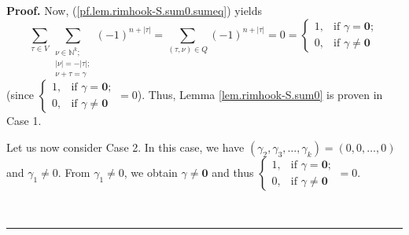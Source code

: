 \documentclass[numbers=enddot,12pt,final,onecolumn,notitlepage]{scrartcl}%
\theoremstyle{definition}
\newenvironment{proof}[1][Proof]{\noindent\textbf{#1.} }{\ \rule{0.5em}{0.5em}}
\let\sumnonlimits\sum
\renewcommand{\sum}{\sumnonlimits\limits}
\begin{document}
\begin{proof}
Now, (\ref{pf.lem.rimhook-S.sum0.sumeq}) yields%
\[
\sum_{\tau\in V}\sum_{\substack{\nu\in\mathbb{N}^{k};\\\left\vert
\nu\right\vert =-\left\vert \tau\right\vert ;\\\nu+\tau=\gamma}}\left(
-1\right)  ^{n+\left\vert \tau\right\vert }=\sum_{\left(  \tau,\nu\right)  \in
Q}\left(  -1\right)  ^{n+\left\vert \tau\right\vert }=0=%
\begin{cases}
1, & \text{if }\gamma=\mathbf{0};\\
0, & \text{if }\gamma\neq\mathbf{0}%
\end{cases}
\]
(since $%
\begin{cases}
1, & \text{if }\gamma=\mathbf{0};\\
0, & \text{if }\gamma\neq\mathbf{0}%
\end{cases}
=0$). Thus, Lemma \ref{lem.rimhook-S.sum0} is proven in Case 1.

Let us now consider Case 2. In this case, we have $\left(  \gamma_{2}%
,\gamma_{3},\ldots,\gamma_{k}\right)  =\left(  0,0,\ldots,0\right)  $ and
$\gamma_{1}\neq0$. From $\gamma_{1}\neq0$, we obtain $\gamma\neq\mathbf{0}$
and thus $%
\begin{cases}
1, & \text{if }\gamma=\mathbf{0};\\
0, & \text{if }\gamma\neq\mathbf{0}%
\end{cases}
=0$.


\end{proof}
\end{document}
